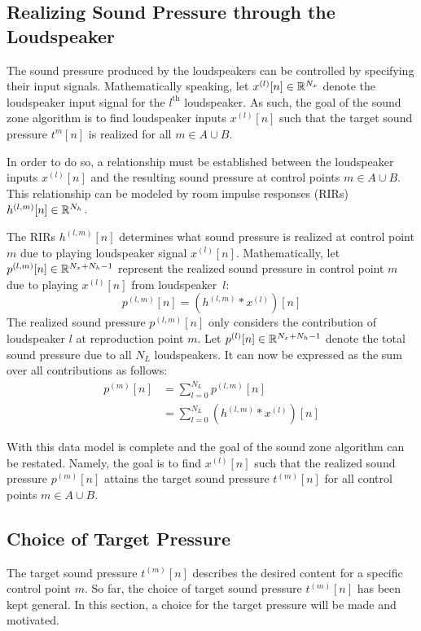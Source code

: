 \subsection{Realizing Sound Pressure through the Loudspeaker}
\label{sec:sound_zones:data_model:realizing_pressure}
The sound pressure produced by the loudspeakers can be controlled by specifying their input signals.
Mathematically speaking, let $x^{(l)}[n]\in\mathbb{R}^{N_x}$ denote the loudspeaker input signal for the $l^\text{th}$ loudspeaker.
As such, the goal of the sound zone algorithm is to find loudspeaker inputs $x^{(l)}[n]$ 
such that the target sound pressure $t^{m}[n]$ is realized for all $m\in A \cup B$.

In order to do so, a relationship must be established between the loudspeaker inputs $x^{(l)}[n]$
and the resulting sound pressure at control points $m\in A \cup B$. 
This relationship can be modeled by room impulse responses (RIRs) $h^{(l,m)}[n]\in\mathbb{R}^{N_h}$.

The RIRs $h^{(l,m)}[n]$ determines what sound pressure is realized at control point $m$ due to playing loudspeaker signal $x^{(l)}[n]$. 
Mathematically, let $p^{(l,m)}[n]\in\mathbb{R}^{N_x + N_h - 1}$ represent the realized sound pressure in control point $m$
due to playing $x^{(l)}[n]$ from loudspeaker~$l$:
\begin{equation}
    p^{(l,m)}[n] = \left(h^{(l,m)} \ast x^{(l)}\right)[n]
\end{equation}
The realized sound pressure $p^{(l,m)}[n]$ only considers the contribution of loudspeaker $l$ at reproduction point $m$.
Let $p^{(l)}[n]\in\mathbb{R}^{N_x + N_h - 1}$ denote the total sound pressure due to all $N_L$ loudspeakers.
It can now be expressed as the sum over all contributions as follows: 
\begin{align}
    p^{(m)}[n] &= \sum_{l=0}^{N_L} p^{(l,m)}[n] \\
               &= \sum_{l=0}^{N_L} \left(h^{(l,m)} \ast x^{(l)}\right)[n]
\end{align}

With this data model is complete and the goal of the sound zone algorithm can be restated.
Namely, the goal is to find $x^{(l)}[n]$ such that the realized sound pressure $p^{(m)}[n]$ attains the
target sound pressure $t^{(m)}[n]$ for all control points $m\in A \cup B$.

\subsection{Choice of Target Pressure}
\label{sec:sound_zones:data_model:target_pressure_choice}
The target sound pressure $t^{(m)}[n]$ describes the desired content for a specific control point $m$. 
So far, the choice of target sound pressure $t^{(m)}[n]$ has been kept general. 
In this section, a choice for the target pressure will be made and motivated.

